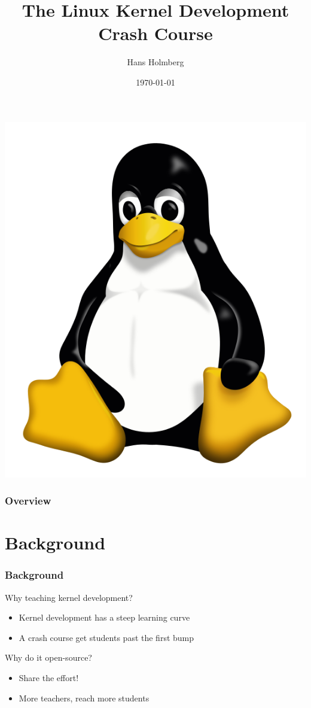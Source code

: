 \documentclass{beamer}
\title[TLKDCC Intro]{The Linux Kernel Development Crash Course}
\author{Hans Holmberg}
\institute[LKTP]
{
Linux Kernel Teaching Project \\ 
\medskip
\textit{hans.holmberg@gmail.com}
}
\date{\today}
\begin{document}
\begin{frame}
\titlepage
\includegraphics{../common/tux}
\end{frame}

\begin{frame}
\frametitle{Overview}
\tableofcontents 
\end{frame}

\section{Background}
\begin{frame}
\frametitle{Background}
Why teaching kernel development?
\begin{itemize}
\item Kernel development has a steep learning curve
\item A crash course get students past the first bump
\end{itemize}

Why do it open-source?
\begin{itemize}
\item Share the effort!
\item More teachers, reach more students
\end{itemize}
\end{frame}
\end{document}
